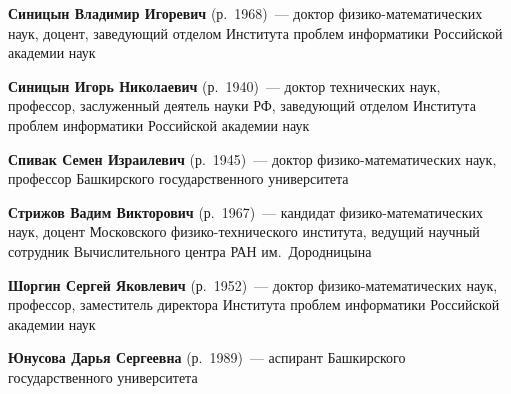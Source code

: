 \begin{multicols}{2}
\vspace*{1pt}


\noindent
\textbf{Синицын Владимир Игоревич} (р.\ 1968)~--- доктор
фи\-зи\-ко-ма\-те\-ма\-ти\-че\-ских наук, доцент, заведующий
отделом Института проблем информатики Российской академии наук

\vspace*{1pt}

\noindent
\textbf{Синицын Игорь Николаевич} (р.\ 1940)~---
доктор технических наук, профессор, заслуженный деятель науки РФ,
заведующий отделом Института проблем информатики Российской академии наук


\vspace*{1pt}


\noindent
\textbf{Спивак Семен Израилевич} (р.\ 1945)~---
доктор фи\-зи\-ко-ма\-те\-ма\-ти\-че\-ских наук, профессор Башкирского
государственного университета

\vspace*{1pt}

\noindent
\textbf{Стрижов Вадим Викторович} (р.\ 1967)~---
кандидат фи\-зи\-ко-ма\-те\-ма\-ти\-че\-ских наук, доцент
Московского фи\-зи\-ко-тех\-ни\-че\-ско\-го института, ведущий научный
сотрудник Вычислительного центра РАН им.\ Дородницына

\vspace*{1pt}

\noindent
\textbf{Шоргин Сергей Яковлевич} (р.\ 1952)~---
доктор фи\-зи\-ко-ма\-те\-ма\-ти\-че\-ских наук, профессор, заместитель директора
Института проблем информатики Российской академии наук


\vspace*{1pt}


\noindent
\textbf{Юнусова Дарья Сергеевна} (р.\ 1989)~---
аспирант Башкирского государственного университета









 \label{end\stat}










\end{multicols}

\newpage